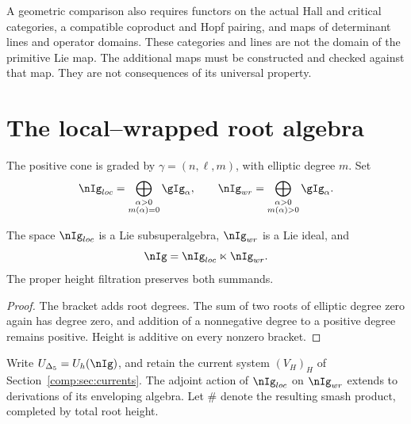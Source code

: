 A geometric comparison also requires functors on the actual Hall
and critical categories, a compatible coproduct and Hopf pairing,
and maps of determinant lines and operator domains. These categories
and lines are not the domain of the primitive Lie map. The
additional maps must be constructed and checked against that map.
They are not consequences of its universal property.


\section{The local--wrapped root algebra}
The positive cone is graded by $\gamma=(n,\ell,m)$, with elliptic degree $m$.  Set
\[
 \nIg_{\loc}=\bigoplus_{\substack{\alpha>0\\m(\alpha)=0}}\gIg_\alpha,
 \qquad
 \nIg_{\wrap}=\bigoplus_{\substack{\alpha>0\\m(\alpha)>0}}\gIg_\alpha.
\]

\begin{proposition}
The space $\nIg_{\loc}$ is a Lie subsuperalgebra, $\nIg_{\wrap}$ is a Lie ideal, and
\[
 \nIg=\nIg_{\loc}\ltimes\nIg_{\wrap}.
\]
The proper height filtration preserves both summands.
\end{proposition}
\begin{proof}
The bracket adds root degrees.  The sum of two roots of elliptic degree zero again has degree zero, and addition of a nonnegative degree to a positive degree remains positive.  Height is additive on every nonzero bracket.
\end{proof}

Write \(\mathbb U_{\Delta_5}=\widehat U_h(\nIg)\), and
retain the current system \((V_H)_H\) of
Section~\ref{comp:sec:currents}. The adjoint action of
\(\nIg_{\loc}\) on \(\nIg_{\wrap}\) extends to derivations
of its enveloping algebra. Let \(\#\) denote the resulting
smash product, completed by total root height.

